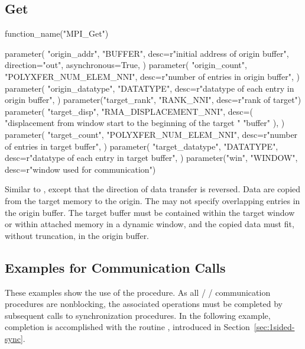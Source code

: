\subsection{Get}
\label{sec:onesided-get}

%
%
\begin{mpi-binding}
    function_name("MPI_Get")
    
    parameter(
        "origin_addr",
        "BUFFER",
        desc=r"initial address of origin buffer",
        direction="out",
        asynchronous=True,
    )
    parameter(
        "origin_count",
        "POLYXFER_NUM_ELEM_NNI",
        desc=r"number of entries in origin buffer",
    )
    parameter(
        "origin_datatype",
        "DATATYPE",
        desc=r"datatype of each entry in origin buffer",
    )
    parameter("target_rank", "RANK_NNI", desc=r"rank of target")
    parameter(
        "target_disp",
        "RMA_DISPLACEMENT_NNI",
        desc=(
            "displacement from window start to the beginning of the target "
            "buffer"
        ),
    )
    parameter(
        "target_count",
        "POLYXFER_NUM_ELEM_NNI",
        desc=r"number of entries in target buffer",
    )
    parameter(
        "target_datatype",
        "DATATYPE",
        desc=r"datatype of each entry in target buffer",
    )
    parameter("win", "WINDOW", desc=r"window used for communication")
\end{mpi-binding}

Similar to , except that the direction of data
transfer is reversed.  Data are copied from the target memory to the origin.
The  may not specify overlapping entries in
the origin buffer.
The target buffer must be contained within the target window
or within attached memory in a dynamic window, and the
copied data must fit, without truncation,
in the origin buffer. 

\subsection{Examples for Communication Calls}
\label{sec:1sided-example}

These examples show the use of the  procedure.
  As all \MPI/ \RMA/ communication procedures are nonblocking, the associated operations
  must be completed by subsequent calls to synchronization procedures.
  In the following example, completion is accomplished with the
  routine , introduced in
  Section~\ref{sec:1sided-sync}.

